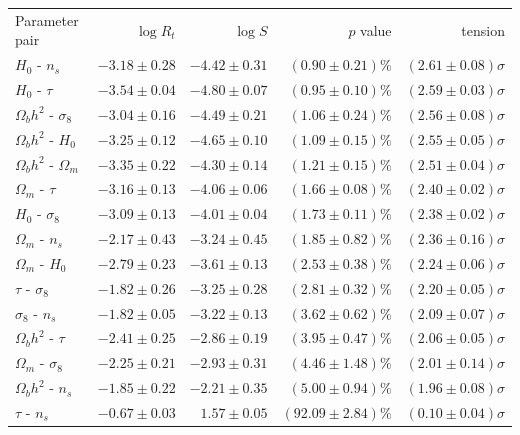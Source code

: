 \documentclass[%
 reprint,
 amsmath,amssymb,
 aps,
]{revtex4-2}
\begin{document}
\begin{table}
\begin{ruledtabular}
\begin{tabular}{l r r r r}
    Parameter pair & $\log R_t$ & $\log S$ & $p$ value & tension \\
    \colrule
    $H_0$ - $n_s$               &	$-3.18 \pm 0.28$ & $-4.42 \pm 0.31$ & $(0.90 \pm 0.21)\%$ & $(2.61 \pm 0.08)\sigma$ \\
    $H_0$ - $\tau$              &	$-3.54 \pm 0.04$ & $-4.80 \pm 0.07$ & $(0.95 \pm 0.10)\%$ & $(2.59 \pm 0.03)\sigma$ \\
    $\Omega_b h^2$ - $\sigma_8$ &	$-3.04 \pm 0.16$ & $-4.49 \pm 0.21$ & $(1.06 \pm 0.24)\%$ & $(2.56 \pm 0.08)\sigma$ \\
    $\Omega_b h^2$ - $H_0$      &	$-3.25 \pm 0.12$ & $-4.65 \pm 0.10$ & $(1.09 \pm 0.15)\%$ & $(2.55 \pm 0.05)\sigma$ \\
    $\Omega_b h^2$ - $\Omega_m$ &	$-3.35 \pm 0.22$ & $-4.30 \pm 0.14$ & $(1.21 \pm 0.15)\%$ & $(2.51 \pm 0.04)\sigma$ \\
    $\Omega_m$ - $\tau$         &	$-3.16 \pm 0.13$ & $-4.06 \pm 0.06$ & $(1.66 \pm 0.08)\%$ & $(2.40 \pm 0.02)\sigma$ \\
    $H_0$ - $\sigma_8$          &	$-3.09 \pm 0.13$ & $-4.01 \pm 0.04$ & $(1.73 \pm 0.11)\%$ & $(2.38 \pm 0.02)\sigma$ \\
    $\Omega_m$ - $n_s$          &	$-2.17 \pm 0.43$ & $-3.24 \pm 0.45$ & $(1.85 \pm 0.82)\%$ & $(2.36 \pm 0.16)\sigma$ \\
    $\Omega_m$ - $H_0$          &	$-2.79 \pm 0.23$ & $-3.61 \pm 0.13$ & $(2.53 \pm 0.38)\%$ & $(2.24 \pm 0.06)\sigma$ \\
    $\tau$ - $\sigma_8$         &	$-1.82 \pm 0.26$ & $-3.25 \pm 0.28$ & $(2.81 \pm 0.32)\%$ & $(2.20 \pm 0.05)\sigma$ \\
    $\sigma_8$ - $n_s$          &	$-1.82 \pm 0.05$ & $-3.22 \pm 0.13$ & $(3.62 \pm 0.62)\%$ & $(2.09 \pm 0.07)\sigma$ \\
    $\Omega_b h^2$ - $\tau$     &	$-2.41 \pm 0.25$ & $-2.86 \pm 0.19$ & $(3.95 \pm 0.47)\%$ & $(2.06 \pm 0.05)\sigma$ \\
    $\Omega_m$ - $\sigma_8$     &	$-2.25 \pm 0.21$ & $-2.93 \pm 0.31$ & $(4.46 \pm 1.48)\%$ & $(2.01 \pm 0.14)\sigma$ \\
    $\Omega_b h^2$ - $n_s$      &	$-1.85 \pm 0.22$ & $-2.21 \pm 0.35$ & $(5.00 \pm 0.94)\%$ & $(1.96 \pm 0.08)\sigma$ \\
    $\tau$ - $n_s$              &	$-0.67 \pm 0.03$ & $1.57 \pm 0.05$ & $(92.09 \pm 2.84)\%$ & $(0.10 \pm 0.04)\sigma$ \\

\end{tabular}
\end{ruledtabular}
\end{table}
\end{document}

